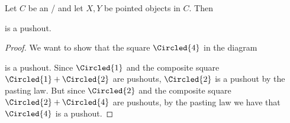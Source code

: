 \begin{lemma}\label{lem:poOfCollapseMapsIsTrivial}
    Let $C$ be an \inftytop/ and let $X,Y$ be pointed objects in $C$. 
    Then 
    \begin{center}
    \end{center}
    is a pushout.
    \begin{proof}
        We want to show that the square $\Circled{4}$ in the diagram
        \begin{center}
        \end{center}
        is a pushout.
        Since $\Circled{1}$ and the composite square $\Circled{1}+\Circled{2}$ are pushouts, $\Circled{2}$ is a pushout by the pasting law.
        But since $\Circled{2}$ and the composite square $\Circled{2}+\Circled{4}$ are pushouts, by the pasting law we have that $\Circled{4}$ is a pushout.
    \end{proof}
\end{lemma}
